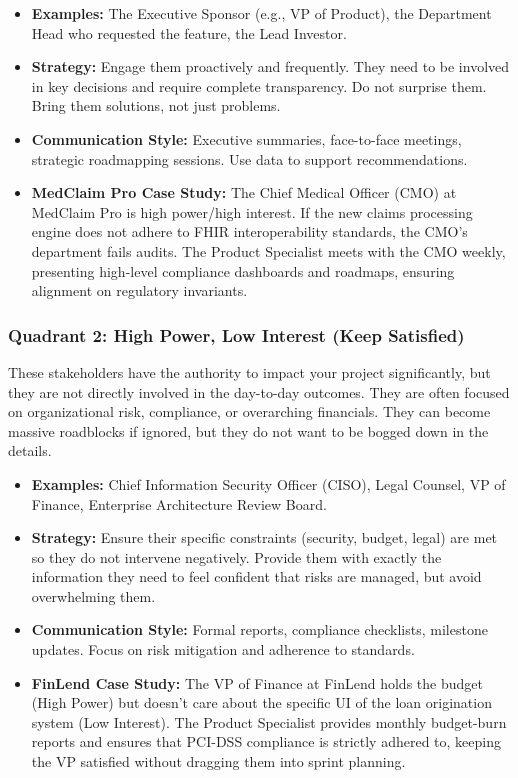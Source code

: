\documentclass[
  11pt,
  openany,
  oneside]{book}
\providecommand{\tightlist}{%
  \setlength{\itemsep}{0pt}\setlength{\parskip}{0pt}}
\begin{document}
\begin{itemize}
\tightlist
\item
  \textbf{Examples:} The Executive Sponsor (e.g., VP of Product), the
  Department Head who requested the feature, the Lead Investor.
\item
  \textbf{Strategy:} Engage them proactively and frequently. They need
  to be involved in key decisions and require complete transparency. Do
  not surprise them. Bring them solutions, not just problems.
\item
  \textbf{Communication Style:} Executive summaries, face-to-face
  meetings, strategic roadmapping sessions. Use data to support
  recommendations.
\item
  \textbf{MedClaim Pro Case Study:} The Chief Medical Officer (CMO) at
  MedClaim Pro is high power/high interest. If the new claims processing
  engine does not adhere to FHIR interoperability standards, the CMO's
  department fails audits. The Product Specialist meets with the CMO
  weekly, presenting high-level compliance dashboards and roadmaps,
  ensuring alignment on regulatory invariants.
\end{itemize}

\subsubsection{Quadrant 2: High Power, Low Interest (Keep
Satisfied)}\label{quadrant-2-high-power-low-interest-keep-satisfied}

These stakeholders have the authority to impact your project
significantly, but they are not directly involved in the day-to-day
outcomes. They are often focused on organizational risk, compliance, or
overarching financials. They can become massive roadblocks if ignored,
but they do not want to be bogged down in the details.

\begin{itemize}
\tightlist
\item
  \textbf{Examples:} Chief Information Security Officer (CISO), Legal
  Counsel, VP of Finance, Enterprise Architecture Review Board.
\item
  \textbf{Strategy:} Ensure their specific constraints (security,
  budget, legal) are met so they do not intervene negatively. Provide
  them with exactly the information they need to feel confident that
  risks are managed, but avoid overwhelming them.
\item
  \textbf{Communication Style:} Formal reports, compliance checklists,
  milestone updates. Focus on risk mitigation and adherence to
  standards.
\item
  \textbf{FinLend Case Study:} The VP of Finance at FinLend holds the
  budget (High Power) but doesn't care about the specific UI of the loan
  origination system (Low Interest). The Product Specialist provides
  monthly budget-burn reports and ensures that PCI-DSS compliance is
  strictly adhered to, keeping the VP satisfied without dragging them
  into sprint planning.
\end{itemize}
\end{document}

